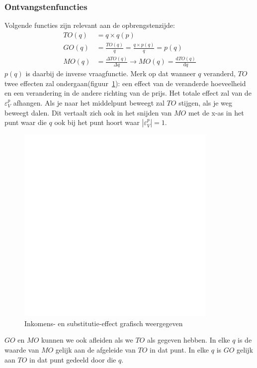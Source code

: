 \subsubsection{Ontvangstenfuncties}
Volgende functies zijn relevant aan de opbrengstenzijde:
\begin{subequations}
\begin{align}
	TO(q) &= q \times q(p)\\
    GO(q) &= \frac{TO(q)}{q} = \frac{q \times p(q)}{q} = p(q)\\
    MO(q) &= \frac{\Delta TO(q)}{\Delta q} \rightarrow MO(q) = \frac{\mathrm{d} TO(q)}{\mathrm{d}q}
\end{align}
\end{subequations}
$p(q)$ is daarbij de inverse vraagfunctie. Merk op dat wanneer $q$ veranderd, $TO$ twee effecten zal ondergaan(figuur~\ref{fig:GOenTO}): een effect van de veranderde hoeveelheid en een verandering in de andere richting van de prijs. Het totale effect zal van de $\varepsilon_{V}^p$ afhangen. Als je naar het middelpunt beweegt zal $TO$ stijgen, als je weg beweegt dalen. Dit vertaalt zich ook in het snijden van $MO$ met de x-as in het punt waar die $q$ ook bij het punt hoort waar $|\varepsilon_{V}^p| = 1$.

\begin{figure}[htbp]
	\centering
	\includegraphics[scale=0.4]{Images/white.png}
	\caption{Inkomens- en substitutie-effect grafisch weergegeven}
	\label{fig:GOenTO}
\end{figure}

$GO$ en $MO$ kunnen we ook afleiden als we $TO$ als gegeven hebben. In elke $q$ is de waarde van $MO$ gelijk aan de afgeleide van $TO$ in dat punt. In elke $q$ is $GO$ gelijk aan $TO$ in dat punt gedeeld door die $q$.


